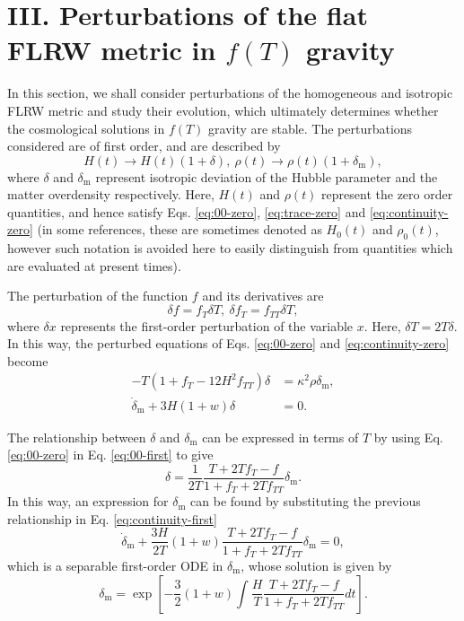 \documentclass[prl,floatfix,showpacs,twocolumn,preprintnumbers,amsmath,amssymb,superscriptaddress]{revtex4}
\begin{document}
\section{III. Perturbations of the flat FLRW metric in $f(T)$ gravity}

In this section, we shall consider perturbations of the homogeneous and isotropic FLRW metric and study their evolution, which ultimately determines whether the cosmological solutions in $f(T)$ gravity are stable. The perturbations considered are of first order, and are described by
\begin{equation}
H(t) \rightarrow H(t)\left(1+\delta\right), \: \rho(t) \rightarrow \rho(t)\left(1+\delta_{\text{m}}\right),
\end{equation}
where $\delta$ and $\delta_{\text{m}}$ represent isotropic deviation of the Hubble parameter and the matter overdensity respectively. Here, $H(t)$ and $\rho(t)$ represent the zero order quantities, and hence satisfy Eqs. \eqref{eq:00-zero}, \eqref{eq:trace-zero} and \eqref{eq:continuity-zero} (in some references, these are sometimes denoted as $H_0(t)$ and $\rho_0(t)$, however such notation is avoided here to easily distinguish from quantities which are evaluated at present times).

The perturbation of the function $f$ and its derivatives are
\begin{equation}
\delta f = f_T \delta T, \: \delta f_T = f_{TT} \delta T,
\end{equation}
where $\delta x$ represents the first-order perturbation of the variable $x$. Here, $\delta T = 2T \delta$. In this way, the perturbed equations of Eqs. \eqref{eq:00-zero} and \eqref{eq:continuity-zero} become
\begin{align}
-T\left(1+f_T-12H^2f_{TT}\right)\delta &= \kappa^2 \rho \delta_{\text{m}}, \label{eq:00-first} \\
\dot{\delta}_{\text{m}} + 3H(1+w)\delta &= 0. \label{eq:continuity-first}
\end{align}

The relationship between $\delta$ and $\delta_{\text{m}}$ can be expressed in terms of $T$ by using Eq. \eqref{eq:00-zero} in Eq. \eqref{eq:00-first} to give
\begin{equation}\label{eq:delta-deltam-rel}
\delta = \dfrac{1}{2T}\dfrac{T+2Tf_T-f}{1+f_T+2Tf_{TT}}\delta_{\text{m}}.
\end{equation}
In this way, an expression for $\delta_{\text{m}}$ can be found by substituting the previous relationship in Eq. \eqref{eq:continuity-first} 
\begin{equation}
\dot{\delta}_{\text{m}} + \dfrac{3H}{2T}(1+w)\dfrac{T+2Tf_T-f}{1+f_T+2Tf_{TT}}\delta_{\text{m}}= 0,
\end{equation}
which is a separable first-order ODE in $\delta_{\text{m}}$, whose solution is given by
\begin{equation}\label{eq:deltam-sol1}
\delta_{\text{m}} = \exp\left[-\dfrac{3}{2}(1+w)\int \dfrac{H}{T}\dfrac{T+2Tf_T-f}{1+f_T+2Tf_{TT}} dt\right].
\end{equation}
\end{document}
